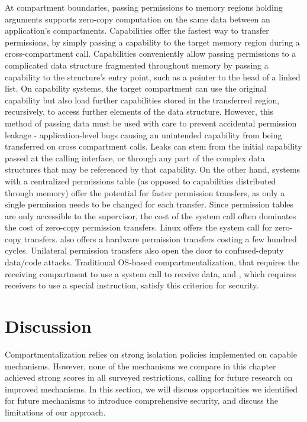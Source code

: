At compartment boundaries, passing permissions to memory regions holding 
arguments supports zero-copy computation on the same data between 
an application's compartments.
Capabilities offer the fastest way to transfer permissions, by simply passing
a capability to the target memory region during a cross-compartment call.
Capabilities conveniently allow passing permissions to a complicated
data structure fragmented throughout memory by passing a capability to the
structure's entry point, such as a pointer to the head of a linked list.
On capability systems, the target compartment can use the original capability
but also load further capabilities stored in the transferred region, recursively,
to access further elements of the data structure.
However, this method of passing data must be used with care to prevent
accidental permission leakage - application-level bugs causing an unintended
capability from being transferred on cross compartment calls.
Leaks can stem from the initial capability passed at the calling interface,
or through any part of the complex data structures that may be referenced by
that capability.
On the other hand, systems with a centralized permissions table (as opposed to
capabilities distributed through memory) offer the potential for faster permission
transfers, as only a single permission needs to be changed for each transfer.
Since permission tables are only accessible to the supervisor,
the cost of the system call often dominates the cost of zero-copy permission transfers.
Linux offers the  system call for zero-copy transfers.
\seccells also offers a hardware permission transfers costing a few hundred cycles.
Unilateral permission transfers also open the door to confused-deputy data/code attacks.
Traditional OS-based compartmentalization, that requires the receiving compartment to
use a system call to receive data, and \seccells, which requires receivers to use a
special instruction, satisfy this criterion for security.

\section{Discussion}
\label{sec:compsok:discussion}
Compartmentalization relies on strong isolation policies implemented on capable
mechanisms. 
However, none of the mechanisms we compare in this chapter achieved strong scores in
all surveyed restrictions, calling for future research on improved mechanisms.
In this section, we will discuss opportunities we identified for future mechanisms
to introduce comprehensive security, and discuss the limitations of our approach.

